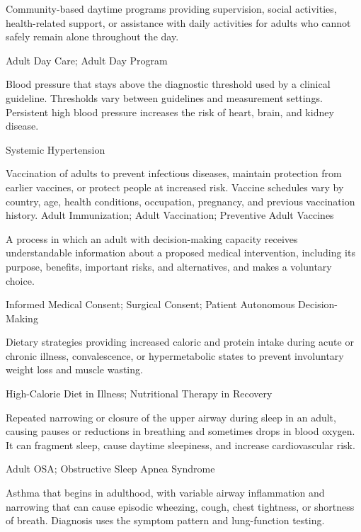 Community-based daytime programs providing supervision, social activities, health-related support, or assistance with daily activities for adults who cannot safely remain alone throughout the day.

\synonyms
Adult Day Care; Adult Day Program

 Blood pressure that stays above the diagnostic threshold used by a clinical guideline. Thresholds vary between guidelines and measurement settings. Persistent high blood pressure increases the risk of heart, brain, and kidney disease.

\synonyms
Systemic Hypertension

 Vaccination of adults to prevent infectious diseases, maintain protection from earlier vaccines, or protect people at increased risk. Vaccine schedules vary by country, age, health conditions, occupation, pregnancy, and previous vaccination history.
\synonyms
Adult Immunization; Adult Vaccination; Preventive Adult Vaccines

 A process in which an adult with decision-making capacity receives understandable information about a proposed medical intervention, including its purpose, benefits, important risks, and alternatives, and makes a voluntary choice.

\synonyms
Informed Medical Consent; Surgical Consent; Patient Autonomous Decision-Making

 Dietary strategies providing increased caloric and protein intake during acute or chronic illness, convalescence, or hypermetabolic states to prevent involuntary weight loss and muscle wasting.

\synonyms
High-Calorie Diet in Illness; Nutritional Therapy in Recovery

 Repeated narrowing or closure of the upper airway during sleep in an adult, causing pauses or reductions in breathing and sometimes drops in blood oxygen. It can fragment sleep, cause daytime sleepiness, and increase cardiovascular risk.

\synonyms
Adult OSA; Obstructive Sleep Apnea Syndrome

 Asthma that begins in adulthood, with variable airway inflammation and narrowing that can cause episodic wheezing, cough, chest tightness, or shortness of breath. Diagnosis uses the symptom pattern and lung-function testing.

